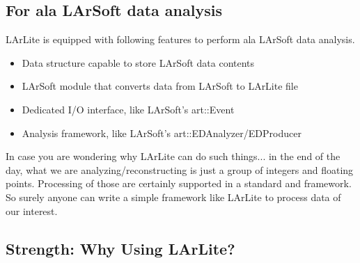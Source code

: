 \subsection{For ala LArSoft data analysis}
LArLite is equipped with following features to perform ala LArSoft data analysis.
\begin{itemize}
\item Data structure capable to store LArSoft data contents
\item LArSoft module that converts data from LArSoft to LArLite \ROOT file
\item Dedicated I/O interface, like LArSoft's {\ttfamily art::Event}
\item Analysis framework, like LArSoft's {\ttfamily art::EDAnalyzer/EDProducer}
\end{itemize}

In case you are wondering why LArLite can do such things... in the end of the day, what we are analyzing/reconstructing is just a group of integers and floating points.
Processing of those are certainly supported in a standard \CPP and \ROOT framework.
So surely anyone can write a simple framework like LArLite to process data of our interest.

\subsection{Strength: Why Using LArLite?}

